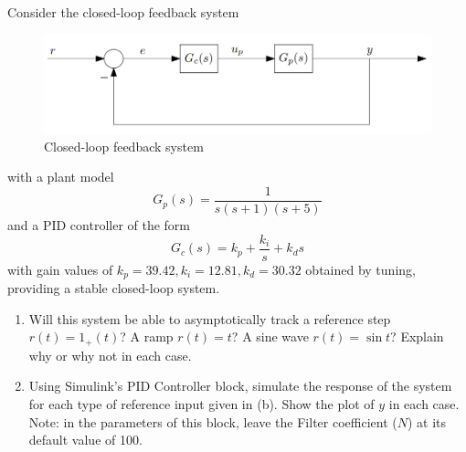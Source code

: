 \section{}
Consider the closed-loop feedback system
\begin{figure}[h]
    \centering
    \includegraphics[width=0.8\linewidth]{Questions/Figures/Q2ProblemDiagram.png}
    \caption{Closed-loop feedback system}
    \label{fig:Q2ProblemDiagram}
\end{figure}
with a plant model
\begin{equation*}
    G_p(s) = \frac{1}{s(s+1)(s+5)}
\end{equation*}
and a PID controller of the form
\begin{equation*}
    G_c(s) = k_p + \frac{k_i}{s} + k_d s
\end{equation*}
with gain values of $k_p = 39.42, k_i = 12.81, k_d = 30.32$ obtained by tuning, providing a stable
closed-loop system. 
\begin{enumerate}[label=(\alph*)]
    \item Will this system be able to asymptotically track a reference step $r(t) = 1_{+}(t)$? A ramp
    $r(t) = t$? A sine wave $r(t) = \sin t$? Explain why or why not in each case.
    \item Using Simulink's PID Controller block, simulate the response of the system for each type of
    reference input given in (b). Show the plot of $y$ in each case. Note: in the parameters of this
    block, leave the Filter coefficient ($N$) at its default value of 100.
\end{enumerate}

